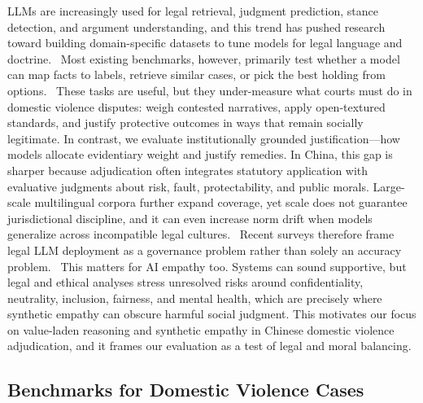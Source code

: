{{LLMs are increasingly used for legal retrieval, judgment prediction, stance detection, and argument understanding, and this trend has pushed research toward building domain-specific datasets to tune models for legal language and doctrine.~\cite{ref29} Most existing benchmarks, however, primarily test whether a model can map facts to labels, retrieve similar cases, or pick the best holding from options.~\cite{ref30} These tasks are useful, but they under-measure what courts must do in domestic violence disputes: weigh contested narratives, apply open-textured standards, and justify protective outcomes in ways that remain socially legitimate. In contrast, we evaluate institutionally grounded justification---how models allocate evidentiary weight and justify remedies. In China, this gap is sharper because adjudication often integrates statutory application with evaluative judgments about risk, fault, protectability, and public morals. Large-scale multilingual corpora further expand coverage, yet scale does not guarantee jurisdictional discipline, and it can even increase norm drift when models generalize across incompatible legal cultures.~\cite{ref31} Recent surveys therefore frame legal LLM deployment as a governance problem rather than solely an accuracy problem.~\cite{ref32} This matters for AI empathy too. Systems can sound supportive, but legal and ethical analyses stress unresolved risks around confidentiality, neutrality, inclusion, fairness, and mental health, which are precisely where synthetic empathy can obscure harmful social judgment. This motivates our focus on value-laden reasoning and synthetic empathy in Chinese domestic violence adjudication, and it frames our evaluation as a test of legal and moral balancing.

\hypertarget{benchmarks-for-domestic-violence-cases}{%
\subsection{Benchmarks for Domestic Violence Cases}\label{benchmarks-for-domestic-violence-cases}

}}}
